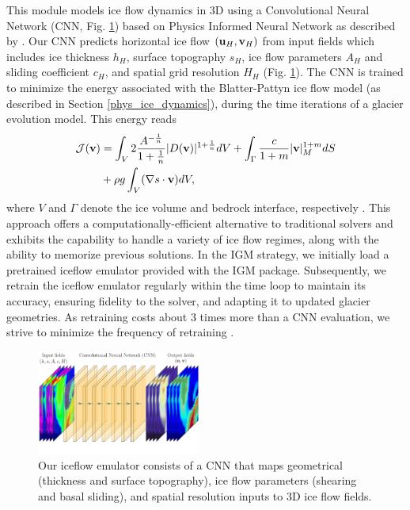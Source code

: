 \documentclass[10pt,twocolumn]{article}
\begin{document}
This module models ice flow dynamics in 3D using a Convolutional Neural Network 
(CNN, Fig. \ref{mapping-illu})
based on Physics Informed Neural Network as described by \citet{jouvet2023ice}. 
Our CNN predicts horizontal ice flow $({\bf u}_H, {\bf v}_H)$ from input fields 
which includes ice thickness $h_H$, surface topography $s_H$, ice flow parameters $A_H$ 
and sliding coefficient $c_H$, and spatial grid resolution $H_H$ (Fig. \ref{mapping-illu}). 
The CNN is trained to minimize the energy associated with the Blatter-Pattyn 
ice flow model (as described in Section \ref{phys_ice_dynamics}), 
during the time iterations of a glacier evolution model. This energy reads
\begin{align}
\mathcal{J} ({\bf v}) & =
\int_{V} 2 \frac{A^{-\frac{1}{n}}}{1+\frac{1}{n}} |  D ({\bf v}) |^{1+\frac{1}{n}}  dV  
+  \int_{\Gamma} \frac{c}{1+m}  |{\bf v}|^{1+m}_M   dS  \nonumber \\
& +  \rho g \int_{V} ( \nabla s \cdot {\bf v} ) dV,
\label{functional}
\end{align}
where $V$ and $\Gamma$ denote the ice volume and bedrock interface, respectively \citep{jouvet2023ice}.
This approach offers a computationally-efficient alternative to traditional solvers and exhibits the capability 
to handle a variety of ice flow regimes, along with the ability to memorize previous solutions.
In the IGM strategy, we initially load a pretrained iceflow emulator provided with the IGM package. 
Subsequently, we retrain the iceflow emulator regularly within 
the time loop to maintain its accuracy, ensuring fidelity to the solver, and adapting 
it to updated glacier geometries. As retraining costs about 3 times more than a CNN evaluation,
we strive to minimize the frequency of retraining \citep{jouvet2023ice}. 

\begin{figure}[!ht]
\begin{center}
\includegraphics[width=0.48\textwidth]{fig/mapping-illu7.pdf}
\caption{\label{mapping-illu} Our iceflow emulator consists of a CNN that maps 
geometrical (thickness and surface topography), ice flow parameters 
(shearing and basal sliding), and spatial resolution inputs to 3D ice flow fields.}
\end{center}
\end{figure}
\end{document}
